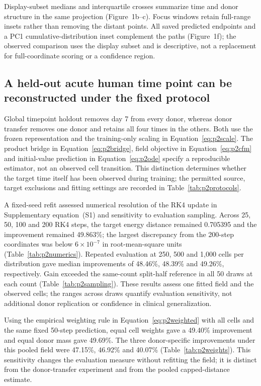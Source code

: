 \documentclass[10pt,a4paper]{article}
\begin{document}
Display-subset medians and interquartile crosses summarize time and donor structure in the same projection (Figure~1b--c). Focus windows retain full-range insets rather than removing the distant points. All saved predicted endpoints and a PC1 cumulative-distribution inset complement the paths (Figure~1f); the observed comparison uses the display subset and is descriptive, not a replacement for full-coordinate scoring or a confidence region.

\subsection{A held-out acute human time point can be reconstructed under the fixed protocol}

Global timepoint holdout removes day 7 from every donor, whereas donor transfer removes one donor and retains all four times in the others. Both use the frozen representation and the training-only scaling in Equation~\eqref{eq:p2scale}. The product bridge in Equation~\eqref{eq:p2bridge}, field objective in Equation~\eqref{eq:p2cfm} and initial-value prediction in Equation~\eqref{eq:p2ode} specify a reproducible estimator, not an observed cell transition. This distinction determines whether the target time itself has been observed during training; the permitted source, target exclusions and fitting settings are recorded in Table~\ref{tab:p2protocols}.

A fixed-seed refit assessed numerical resolution of the RK4 update in Supplementary equation~(S1) and sensitivity to evaluation sampling. Across 25, 50, 100 and 200 RK4 steps, the target energy distance remained 0.705395 and the improvement remained 49.863\%; the largest discrepancy from the 200-step coordinates was below $6\times10^{-7}$ in root-mean-square units (Table~\ref{tab:p2numerics}). Repeated evaluation at 250, 500 and 1,000 cells per distribution gave median improvements of 48.46\%, 48.39\% and 49.26\%, respectively. Gain exceeded the same-count split-half reference in all 50 draws at each count (Table~\ref{tab:p2sampling}). These results assess one fitted field and the observed cells; the ranges across draws quantify evaluation sensitivity, not additional donor replication or confidence in clinical generalization.

Using the empirical weighting rule in Equation~\eqref{eq:p2weighted} with all cells and the same fixed 50-step prediction, equal cell weights gave a 49.40\% improvement and equal donor mass gave 49.69\%. The three donor-specific improvements under this pooled field were 47.15\%, 46.92\% and 40.07\% (Table~\ref{tab:p2weights}). This sensitivity changes the evaluation measure without refitting the field; it is distinct from the donor-transfer experiment and from the pooled capped-distance estimate.
\end{document}
